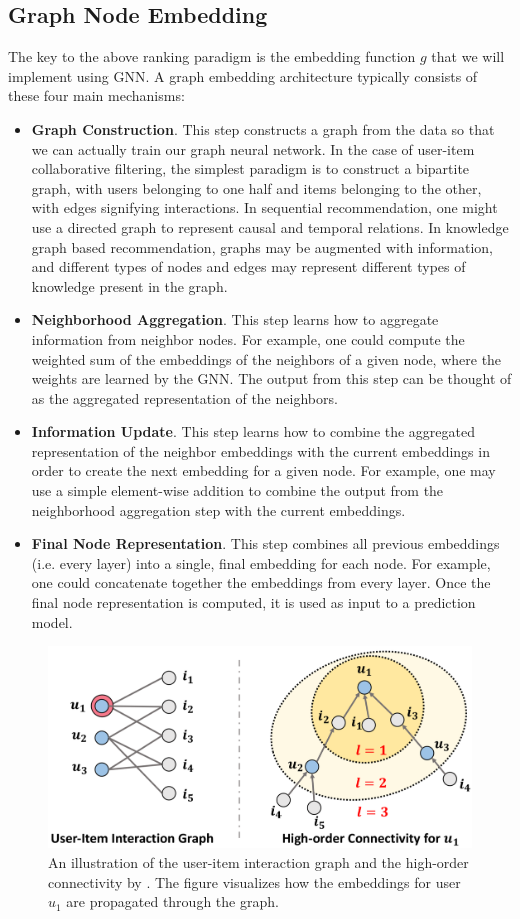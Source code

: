 \documentclass{article}
\begin{document}
\subsection{Graph Node Embedding}

The key to the above ranking paradigm is the embedding function $g$ that we will implement using GNN. A graph embedding architecture typically consists of these four main mechanisms:

\begin{itemize}
    \item \textbf{Graph Construction}. This step constructs a graph from the data so that we can actually train our graph neural network. In the case of user-item collaborative filtering, the simplest paradigm is to construct a bipartite graph, with users belonging to one half and items belonging to the other, with edges signifying interactions. In sequential recommendation, one might use a directed graph to represent causal and temporal relations. In knowledge graph based recommendation, graphs may be augmented with information, and different types of nodes and edges may represent different types of knowledge present in the graph.
    \item \textbf{Neighborhood Aggregation}. This step learns how to aggregate information from neighbor nodes. For example, one could compute the weighted sum of the embeddings of the neighbors of a given node, where the weights are learned by the GNN. The output from this step can be thought of as the aggregated representation of the neighbors.
    \item \textbf{Information Update}. This step learns how to combine the aggregated representation of the neighbor embeddings with the current embeddings in order to create the next embedding for a given node. For example, one may use a simple element-wise addition to combine the output from the neighborhood aggregation step with the current embeddings.
    \item \textbf{Final Node Representation}. This step combines all previous embeddings (i.e. every layer) into a single, final embedding for each node. For example, one could concatenate together the embeddings from every layer. Once the final node representation is computed, it is used as input to a prediction model.
\end{itemize}

\begin{figure}[H]
    \centering
    \includegraphics[width=.6\textwidth]{figs/ngcf-architecture.png}
    \caption{An illustration of the user-item interaction graph and the high-order connectivity by \cite{ngcf}. The figure visualizes how the embeddings for user $u_1$ are propagated through the graph.}
    \label{fig:user-item-interact-graph}
\end{figure}
\end{document}
